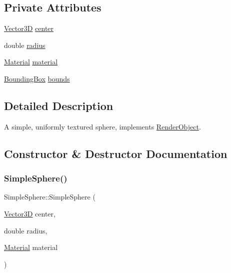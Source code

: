 \subsection*{Private Attributes}
\begin{DoxyCompactItemize}
\item 
\mbox{\hyperlink{classVector3D}{Vector3D}} \mbox{\hyperlink{classSimpleSphere_af432089b8146295c77f52f22835bf1ab}{center}}
\item 
double \mbox{\hyperlink{classSimpleSphere_ad69dbac136ee99110f41b7b84656b144}{radius}}
\item 
\mbox{\hyperlink{classMaterial}{Material}} \mbox{\hyperlink{classSimpleSphere_abfb049ac4dabb0c7fbb78d7791e33e42}{material}}
\item 
\mbox{\hyperlink{classBoundingBox}{Bounding\+Box}} \mbox{\hyperlink{classSimpleSphere_a9e528c29b08c4b70c8b707343576ec57}{bounds}}
\end{DoxyCompactItemize}


\subsection{Detailed Description}
A simple, uniformly textured sphere, implements \mbox{\hyperlink{classRenderObject}{Render\+Object}}. 

\subsection{Constructor \& Destructor Documentation}
\mbox{\label{classSimpleSphere_ae893a4b886a92fe81e1b46766faaf6cd}} 
\subsubsection{\texorpdfstring{SimpleSphere()}{SimpleSphere()}}
{\footnotesize\ttfamily Simple\+Sphere\+::\+Simple\+Sphere (\begin{DoxyParamCaption}\item[{\mbox{\hyperlink{classVector3D}{Vector3D}}}]{center,  }\item[{double}]{radius,  }\item[{\mbox{\hyperlink{classMaterial}{Material}}}]{material }\end{DoxyParamCaption})}

\mbox{\label{classSimpleSphere_a7ffaeb08624ecd5c91ed88c10f2fbff7}} 
